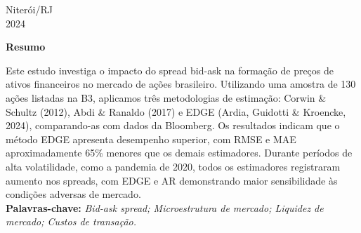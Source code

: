     \begin{center}
        Niterói/RJ\\[0.2cm]
        2024 
    \end{center}
    
    \newpage
    
    \begin{center}
        \textbf{\Large Resumo}\\[0.2cm]
    \end{center}
    
    
    
    \begin{flushleft}
        \setlength{\parskip}{1cm} %
        \linespread{1.5}\selectfont %
        \hspace*{0cm}\parbox{16.5cm}{
            Este estudo investiga o impacto do spread bid-ask na formação de preços de ativos financeiros no mercado de ações brasileiro. Utilizando uma amostra de 130 ações listadas na B3, aplicamos três metodologias de estimação: Corwin \& Schultz (2012), Abdi \& Ranaldo (2017) e EDGE (Ardia, Guidotti \& Kroencke, 2024), comparando-as com dados da Bloomberg. Os resultados indicam que o método EDGE apresenta desempenho superior, com RMSE e MAE aproximadamente 65\% menores que os demais estimadores. Durante períodos de alta volatilidade, como a pandemia de 2020, todos os estimadores registraram aumento nos spreads, com EDGE e AR demonstrando maior sensibilidade às condições adversas de mercado.
            \\
            \linespread{1.5}\selectfont
            \textbf{Palavras-chave:} \textit{Bid-ask spread; Microestrutura de mercado; Liquidez de mercado; Custos de transação.}
        }
    \end{flushleft}
    \newpage
    
    
    
    
    
    
    
    
    
    
    
    \thispagestyle{empty}
    
        
    